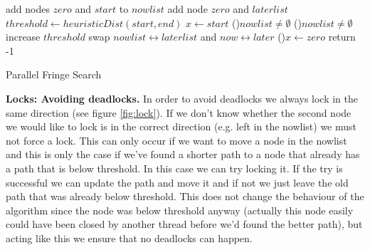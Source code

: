\documentclass[letterpaper]{article}
\newcommand{\mypar}[1]{{\bf #1.}}
\begin{document}
\begin{algorithm}[h]
\SetInd{0.5em}{0.5em}
add nodes $zero$ and $start$ to $nowlist$ \;
add node $zero$ and $laterlist$ \;
$threshold \leftarrow heuristicDist(start, end)$ \;
$x \leftarrow start$ \;
\While(){$nowlist \neq \emptyset$}{
	\While(){$nowlist \neq \emptyset$}{
	}
	increase $threshold$ \;
	swap $nowlist \leftrightarrow laterlist$ and $now \leftrightarrow later$ \;
	\lElse(){$x \leftarrow zero$ }
}
return -1 
\caption{Parallel Fringe Search\label{algo:par}}
\end{algorithm}


\mypar{Locks: Avoiding deadlocks}
In order to avoid deadlocks we always lock in the same direction (see figure \ref{fig:lock}). If we don't know whether the second node we would like to lock is in the correct direction (e.g. left in the nowlist) we must not force a lock. This can only occur if we want to move a node in the nowlist and this is only the case if we've found a shorter path to a node that already has a path that is below threshold. In this case we can try locking it. If the try is successful we can update the path and move it and if not we just leave the old path that was already below threshold. This does not change the behaviour of the algorithm since the node was below threshold anyway (actually this node easily could have been closed by another thread before we'd found the better path), but acting like this we ensure that no deadlocks can happen.
\end{document}
